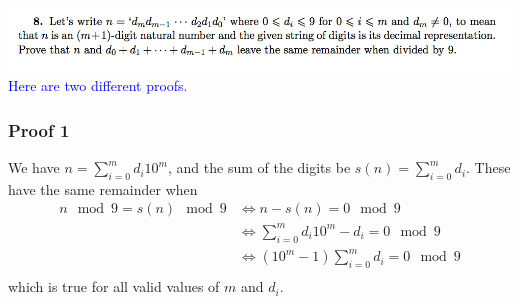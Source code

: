 \documentclass[12pt]{article}
\begin{document}
\subsection*{}
\includegraphics[width=450pt]{img/iulm-2-8.png}\\
\textcolor{blue}{Here are two different proofs.}
\subsubsection*{Proof 1}
\begin{mdframed}
  We have $n = \sum_{i=0}^m d_i 10^m$, and the sum of the digits be
  $s(n) = \sum_{i=0}^m d_i$. These have the same remainder when
  \begin{align*}
    n \mod 9 = s(n) \mod 9
    &\iff n - s(n) = 0 \mod 9\\
    &\iff \sum_{i=0}^m d_i 10^m - d_i = 0 \mod 9\\
    &\iff (10^m - 1)\sum_{i=0}^m d_i = 0 \mod 9\\
  \end{align*}
  which is true for all valid values of $m$ and $d_i$.
\end{mdframed}
~\\
\end{document}

